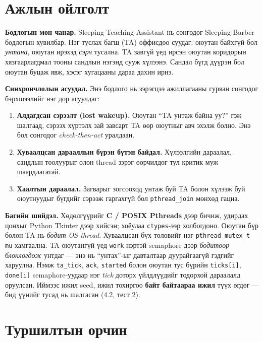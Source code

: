 \documentclass[11pt,a4paper]{article}
\begin{document}
\section{Ажлын ойлголт}

\textbf{Бодлогын мөн чанар.} Sleeping Teaching Assistant нь сонгодог Sleeping
Barber бодлогын хувилбар. Нэг туслах багш (TA) оффисдоо суудаг: оюутан
байхгүй бол \emph{унтана}, оюутан ирэхэд \emph{сэрч} тусална. TA завгүй үед
ирсэн оюутан коридорын хязгаарлагдмал тооны сандлын нэгэнд сууж хүлээнэ.
Сандал бүгд дүүрэн бол оюутан буцаж явж, хэсэг хугацааны дараа дахин ирнэ.

\textbf{Синхрончлолын асуудал.} Энэ бодлого нь зэрэгцээ ажиллагааны гурван
сонгодог бэрхшээлийг нэг дор агуулдаг:

\begin{enumerate}[nosep,leftmargin=*]
\item \textbf{Алдагдсан сэрээлт (lost wakeup).} Оюутан ``TA унтаж байна уу?''
гэж шалгаад, сэрээх хүртэлх зай завсарт TA өөр оюутныг авч эхэлж болно.
Энэ бол сонгодог \emph{check-then-act} уралдаан.
\item \textbf{Хуваалцсан дарааллын бүрэн бүтэн байдал.} Хүлээлгийн дараалал,
сандлын тоолуурыг олон thread зэрэг өөрчилдөг тул критик муж шаардлагатай.
\item \textbf{Хаалтын дараалал.} Загварыг зогсооход унтаж буй TA болон
хүлээж буй оюутнуудыг бүгдийг сэрээж гаргахгүй бол \texttt{pthread\_join}
мөнхөд гацна.
\end{enumerate}

\textbf{Багийн шийдэл.} Хөдөлгүүрийг \textbf{C / POSIX Pthreads} дээр бичиж,
удирдах цонхыг Python Tkinter дээр хийсэн; хоёулаа \texttt{ctypes}-ээр
холбогдоно. Оюутан бүр болон TA нь \emph{бодит OS thread}. Хуваалцсан бүх
төлөвийг нэг \texttt{pthread\_mutex\_t mu} хамгаална. TA оюутангүй үед
\texttt{work} нэртэй semaphore дээр \emph{бодитоор блоклогдож} унтдаг --- энэ
нь ``унтах''-ыг давталтаар дуурайгаагүй гэдгийг харуулна. Нэмж
\texttt{ta\_tick}, \texttt{ack}, \texttt{started} болон оюутан тус бүрийн
\texttt{ticks[i]}, \texttt{done[i]} semaphore-уудаар нэг \emph{tick} доторх
үйлдлүүдийг тодорхой дараалалд оруулсан. Иймээс ижил seed, ижил тохиргоо
\textbf{байт байтаараа ижил} түүх өгдөг --- бид үүнийг тусад нь шалгасан
(4.2, тест 2).

\section{Туршилтын орчин}
\end{document}
